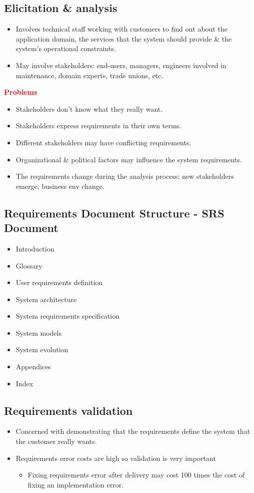 \documentclass{report}
\newcommand{\textr}[1]{\textcolor{red}{#1}}
\newcommand{\textbfr}[1]{\textbf{\textr{#1}}}
\begin{document}
\subsection{Elicitation \& analysis}
\begin{itemize}
  \item Involves technical staff working with customers to find out about the application domain, the
services that the system should provide \& the system's operational constraints.
  \item May involve stakeholders: end-users, managers, engineers involved in maintenance, domain experts, trade unions, etc.
\end{itemize}
\textbfr{Problems}
\begin{itemize}
  \item Stakeholders don't know what they really want.
  \item Stakeholders express requirements in their own terms.
  \item Different stakeholders may have conflicting requirements.
  \item Organizational \& political factors may influence the system requirements.
  \item The requirements change during the analysis process; new stakeholders emerge, business env change.
\end{itemize}

\subsection{Requirements Document Structure - SRS Document}
\begin{itemize}
  \item Introduction
  \item Glossary
  \item User requirements definition
  \item System architecture
  \item System requirements specification
  \item System models
  \item System evolution
  \item Appendices
  \item Index
\end{itemize}

\subsection{Requirements validation}
\begin{itemize}
  \item Concerned with demonstrating that the requirements define the system that the customer really wants.
  \item Requirements error costs are high so validation is very important
  \begin{itemize}
    \item Fixing requirements error after delivery may cost 100 times the cost of fixing an implementation error.
  \end{itemize}
\end{itemize}
  
\end{document}
